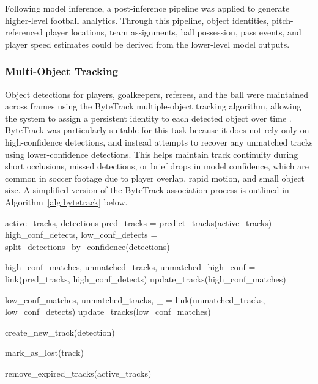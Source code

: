 Following model inference, a post-inference pipeline was applied to generate higher-level football analytics. Through this pipeline, object identities, pitch-referenced player locations, team assignments, ball possession, pass events, and player speed estimates could be derived from the lower-level model outputs.

\subsubsection{Multi-Object Tracking}

Object detections for players, goalkeepers, referees, and the ball were maintained across frames using the ByteTrack multiple-object tracking algorithm, allowing the system to assign a persistent identity to each detected object over time \cite{zhang2022bytetrack}. ByteTrack was particularly suitable for this task because it does not rely only on high-confidence detections, and instead attempts to recover any unmatched tracks using lower-confidence detections. This helps maintain track continuity during short occlusions, missed detections, or brief drops in model confidence, which are common in soccer footage due to player overlap, rapid motion, and small object size. A simplified version of the ByteTrack association process is outlined in Algorithm~\ref{alg:bytetrack} below.

  
\begin{algorithm}[H]
\caption{Simplified ByteTrack association process \cite{zhang2022bytetrack}}
\label{alg:bytetrack}

\footnotesize
\begin{algorithmic}[1]
\Require active\_tracks, detections
\State pred\_tracks = predict\_tracks(active\_tracks)
\State high\_conf\_detects, low\_conf\_detects = split\_detections\_by\_confidence(detections)

\Statex
\State high\_conf\_matches, unmatched\_tracks, unmatched\_high\_conf = link(pred\_tracks, high\_conf\_detects)
\State update\_tracks(high\_conf\_matches)

\Statex
\State low\_conf\_matches, unmatched\_tracks, \_ = link(unmatched\_tracks, low\_conf\_detects)
\State update\_tracks(low\_conf\_matches)

\Statex
{}
    \State create\_new\_track(detection)
\EndFor

\Statex
{}
    \State mark\_as\_lost(track)
\EndFor

\Statex
\State remove\_expired\_tracks(active\_tracks)
\end{algorithmic}
\end{algorithm}

